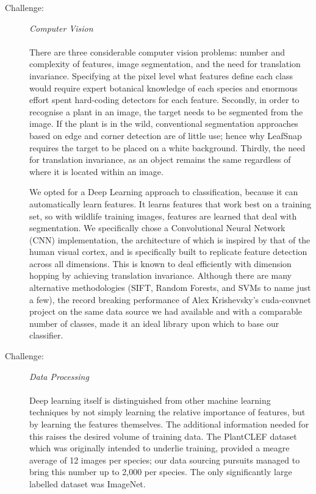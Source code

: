 \documentclass[a4paper,11pt]{article}
\begin{document}
\begin{description}

\item [Challenge:] \textit{Computer Vision}\\\\
There are three considerable computer vision problems: number and complexity of features, image segmentation, and the need for translation invariance. Specifying at the pixel level what features define each class would require expert botanical knowledge of each species and enormous effort spent hard-coding detectors for each feature. Secondly, in order to recognise a plant in an image, the target needs to be segmented from the image. If the plant is in the wild, conventional segmentation approaches based on edge and corner detection are of little use; hence why LeafSnap requires the target to be placed on a white background. Thirdly, the need for translation invariance, as an object remains the same regardless of where it is located within an image.

\hspace{5 mm} We opted for a Deep Learning approach to classification, because it can automatically learn features. It learns features that work best on a training set, so with wildlife training images, features are learned that deal with segmentation. We specifically chose a Convolutional Neural Network (CNN) implementation, the architecture of which is inspired by that of the human visual cortex, and is specifically built to replicate feature detection across all dimensions. This is known to deal efficiently with dimension hopping by achieving translation invariance. Although there are many alternative methodologies (SIFT, Random Forests, and SVMs to name just a few), the record breaking performance of Alex Krishevsky's cuda-convnet \cite{cudaconv_2012} project on the same data source we had available \cite{imagenet} and with a comparable number of classes, made it an ideal library upon which to base our classifier.\\

\item [Challenge:] \textit{Data Processing}\\\\
Deep learning itself is distinguished from other machine learning techniques by not simply learning the relative importance of features, but by learning the features themselves. The additional information needed for this raises the desired volume of training data. The PlantCLEF dataset which was originally intended to underlie training, provided a meagre average of 12 images per species; our data sourcing pursuits managed to bring this number up to 2,000 per species. The only significantly large labelled dataset was ImageNet. 


\end{description}
\end{document}
